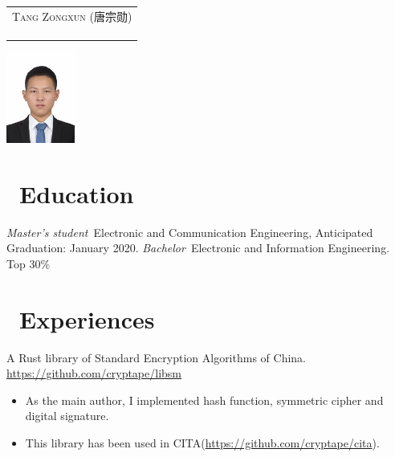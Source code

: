 \documentclass{resume}
\newcommand{\hlink}[1]{\href{#1}{#1}}
\begin{document}

\medskip\noindent
\begin{minipage}{0.7\textwidth}
  \Large{
    \begin{tabu}  { l }
      \scshape{Tang Zongxun (唐宗勋)} \\
       \\
       \\
       \\
    \end{tabu}
  }
\end{minipage}
\begin{minipage}{0.3\textwidth}
  \raggedleft
  \includegraphics[height=30mm]{me}
\end{minipage}

%


\section{\faGraduationCap\  Education}
\textit{Master's student}\ Electronic and Communication Engineering, Anticipated Graduation: January 2020.
\textit{Bachelor}\ Electronic and Information Engineering.
Top 30\%

\section{\faUsers\ Experiences}
A Rust library of Standard Encryption Algorithms of China. \hlink{https://github.com/cryptape/libsm}
\begin{itemize}
  \item As the main author, I implemented hash function, symmetric cipher and digital signature.
  \item This library has been used in CITA(\hlink{https://github.com/cryptape/cita}).
\end{itemize}
\end{document}
